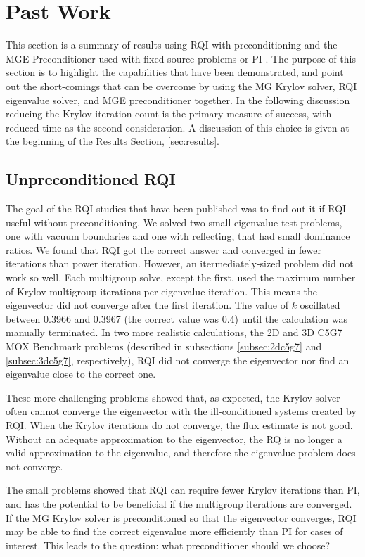 \documentclass[preprint,12pt]{elsarticle}
\begin{document}
\section{Past Work}
\label{sec:pastwork}
This section is a summary of results using RQI with preconditioning \cite{Slaybaugh2012} and the MGE Preconditioner used with fixed source problems or PI \cite{Slaybaugh2013}. The purpose of this section is to highlight the capabilities that have been demonstrated, and point out the short-comings that can be overcome by using the MG Krylov solver, RQI eigenvalue solver, and MGE preconditioner together. In the following discussion reducing the Krylov iteration count is the primary measure of success, with reduced time as the second consideration. A discussion of this choice is given at the beginning of the Results Section, \ref{sec:results}.

\subsection{Unpreconditioned RQI}
The goal of the RQI studies that have been published was to find out it if RQI useful without preconditioning. We solved two small eigenvalue test problems, one with vacuum boundaries and one with reflecting, that had small dominance ratios. We found that RQI got the correct answer and converged in fewer iterations than power iteration. However, an itermediately-sized problem did not work so well. Each multigroup solve, except the first, used the maximum number of Krylov multigroup iterations per eigenvalue iteration. This means the eigenvector did not converge after the first iteration. The value of $k$ oscillated between 0.3966 and 0.3967 (the correct value was 0.4) until the calculation was manually terminated. In two more realistic calculations, the 2D and 3D C5G7 MOX Benchmark problems (described in subsections \ref{subsec:2dc5g7} and \ref{subsec:3dc5g7}, respectively), RQI did not converge the eigenvector nor find an eigenvalue close to the correct one. 

These more challenging problems showed that, as expected, the Krylov solver often cannot converge the eigenvector with the ill-conditioned systems created by RQI. When the Krylov iterations do not converge, the flux estimate is not good. Without an adequate approximation to the eigenvector, the RQ is no longer a valid approximation to the eigenvalue, and therefore the eigenvalue problem does not converge. 

The small problems showed that RQI can require fewer Krylov iterations than PI, and has the potential to be beneficial if the multigroup iterations are converged. If the MG Krylov solver is preconditioned so that the eigenvector converges, RQI may be able to find the correct eigenvalue more efficiently than PI for cases of interest. This leads to the question: what preconditioner should we choose?
\end{document}
